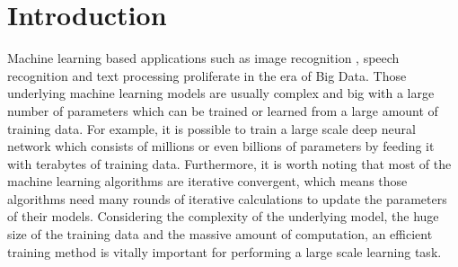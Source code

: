 \documentclass[preprint,review,11pt,a4paper]{elsarticle}
\begin{document}
\section{Introduction}
\label{introduction}

Machine learning based applications such as image recognition \cite{Coates2011An}, speech recognition \cite{dahl2012context} and text processing \cite{collobert2008unified} proliferate in the era of Big Data. Those underlying machine learning models are usually complex and big with a large number of parameters which can be trained or learned from a large amount of training data. For example, it is possible to train a large scale deep neural network which consists of millions or even billions of parameters by feeding it with terabytes of training data. Furthermore, it is worth noting that most of the machine learning algorithms are iterative convergent, which means those algorithms need many rounds of iterative calculations to update the parameters of their models. Considering the complexity of the underlying model, the huge size of the training data and the massive amount of computation, an efficient training method is vitally important for performing a large scale learning task.
\end{document}
